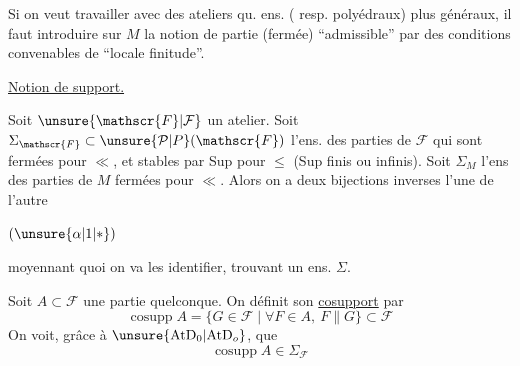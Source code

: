 
Si on veut travailler avec des ateliers qu. ens. ( resp. polyédraux) plus généraux, il faut introduire sur $M$ la notion de  partie (fermée) ``admissible'' par des conditions convenables de ``locale finitude''.


\uline{Notion de support.}

Soit $\unsure{\mathscr{F}|\mathcal{F}}$ un atelier. Soit $\Sigma_{\mathscr{F}}\subset\unsure{\mathcal{P}|P}(\mathscr{F})$ l'ens. des parties de $\mathscr{F}$ qui sont fermées  pour  $\ll$, et stables par Sup pour $\leq$ (Sup finis ou infinis). Soit $\Sigma_M$ l'ens des parties de $M$ fermées pour $\ll$. Alors on a deux bijections inverses l'une de l'autre

\noindent $(\unsure{\alpha|1|*})$

moyennant quoi on va les identifier, trouvant un ens. $\Sigma$.

Soit $A\subset\mathscr{F}$ une partie quelconque. On définit son \uline{cosupport} par
\[
\operatorname{cosupp}A=\{G\in\mathscr{F}\mid\forall F\in A,\ F\parallel G\}\subset\mathscr{F}
\]
On voit, grâce à $\unsure{\mathrm{AtD}_0|\mathrm{AtD}_o}$, que
\[
\operatorname{cosupp}A\in\Sigma_{\mathscr{F}}
\]


